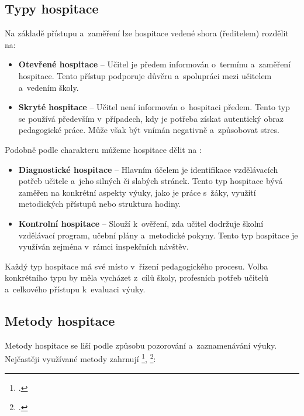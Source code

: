 \subsection{Typy hospitace}

Na základě přístupu a~zaměření lze hospitace vedené shora (ředitelem) rozdělit na:

\begin{itemize}
    \item \textbf{Otevřené hospitace} – Učitel je předem informován o~termínu a~zaměření hospitace. Tento přístup podporuje důvěru a~spolupráci mezi učitelem a~vedením školy.
    \item \textbf{Skryté hospitace} – Učitel není informován o~hospitaci předem. Tento typ se používá především v~případech, kdy je potřeba získat autentický obraz pedagogické práce. Může však být vnímán negativně a~způsobovat stres.
\end{itemize}

Podobně podle charakteru můžeme hospitace dělit na :
\begin{itemize}
    \item \textbf{Diagnostické hospitace} – Hlavním účelem je identifikace vzdělávacích potřeb učitele a~jeho silných či slabých stránek. Tento typ hospitace bývá zaměřen na konkrétní aspekty výuky, jako je práce s~žáky, využití metodických přístupů nebo struktura hodiny.
    \item \textbf{Kontrolní hospitace} – Slouží k~ověření, zda učitel dodržuje školní vzdělávací program, učební plány a~metodické pokyny. Tento typ hospitace je využíván zejména v~rámci inspekčních návštěv.
\end{itemize}

Každý typ hospitace má své místo v~řízení pedagogického procesu. Volba konkrétního typu by měla vycházet z~cílů školy, profesních potřeb učitelů a~celkového přístupu k~evaluaci výuky.

\subsection{Metody hospitace}

Metody hospitace se liší podle způsobu pozorování a~zaznamenávání výuky. Nejčastěji využívané metody zahrnují \footcite{nastroje-hodnoceni}, \footcite{ped-proces-rizeni}:

